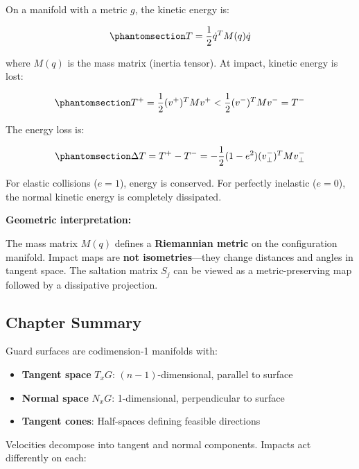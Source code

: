 \documentclass[
  letterpaper,
  DIV=11,
  numbers=noendperiod]{scrartcl}
\providecommand{\tightlist}{%
  \setlength{\itemsep}{0pt}\setlength{\parskip}{0pt}}\usepackage{longtable,booktabs,array}
\begin{document}
On a manifold with a metric \(g\), the kinetic energy is:

\begin{equation}\phantomsection\label{eq-kinetic-energy}{
T = \frac{1}{2} \dot{q}^T M(q) \dot{q}
}\end{equation}

where \(M(q)\) is the mass matrix (inertia tensor). At impact, kinetic
energy is lost:

\begin{equation}\phantomsection\label{eq-energy-loss}{
T^+ = \frac{1}{2} (v^+)^T M v^+ < \frac{1}{2} (v^-)^T M v^- = T^-
}\end{equation}

The energy loss is:

\begin{equation}\phantomsection\label{eq-energy-dissipation}{
\Delta T = T^+ - T^- = -\frac{1}{2}(1 - e^2) (v_\perp^-)^T M v_\perp^-
}\end{equation}

For elastic collisions (\(e = 1\)), energy is conserved. For perfectly
inelastic (\(e = 0\)), the normal kinetic energy is completely
dissipated.

\textbf{Geometric interpretation:}

The mass matrix \(M(q)\) defines a \textbf{Riemannian metric} on the
configuration manifold. Impact maps are \textbf{not isometries}---they
change distances and angles in tangent space. The saltation matrix
\(S_j\) can be viewed as a metric-preserving map followed by a
dissipative projection.

\subsection{Chapter Summary}\label{chapter-summary-3}

Guard surfaces are codimension-1 manifolds with:

\begin{itemize}
\tightlist
\item
  \textbf{Tangent space} \(T_x G\): \((n-1)\)-dimensional, parallel to
  surface
\item
  \textbf{Normal space} \(N_x G\): 1-dimensional, perpendicular to
  surface
\item
  \textbf{Tangent cones}: Half-spaces defining feasible directions
\end{itemize}

Velocities decompose into tangent and normal components. Impacts act
differently on each:
\end{document}
